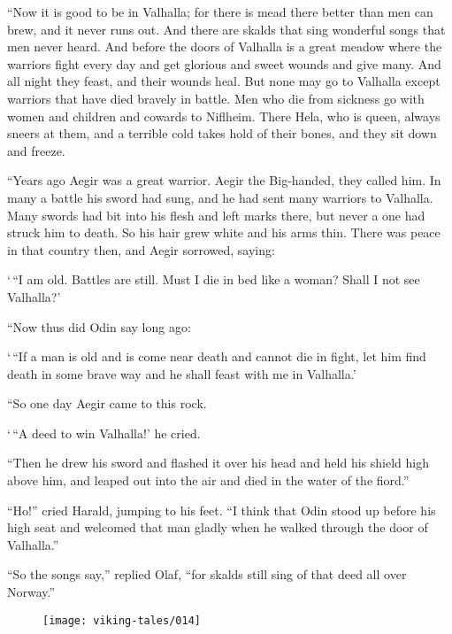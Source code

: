 ``Now it is good to be in Valhalla; for there is mead there better than
men can brew, and it never runs out. And there are skalds that sing
wonderful songs that men never heard. And before the doors of Valhalla
is a great meadow where the warriors fight every day and get glorious
and sweet wounds and give many. And all night they feast, and their
wounds heal. But none may go to Valhalla except warriors that have died
bravely in battle. Men who die from sickness go with women and children
and cowards to Niflheim. There Hela, who is queen, always sneers at
them, and a terrible cold takes hold of their bones, and they sit down
and freeze.

``Years ago Aegir was a great warrior. Aegir the Big-handed, they called
him. In many a battle his sword had sung, and he had sent many warriors
to Valhalla. Many swords had bit into his flesh and left marks there,
but never a one had struck him to death. So his hair grew white and his
arms thin. There was peace in that country then, and Aegir sorrowed,
saying:

`\,``I am old. Battles are still. Must I die in bed like a woman? Shall I
not see Valhalla?'

``Now thus did Odin say long ago:

`\,``If a man is old and is come near death and cannot die in fight, let
him find death in some brave way and he shall feast with me in
Valhalla.'

``So one day Aegir came to this rock.

`\,``A deed to win Valhalla!' he cried.

``Then he drew his sword and flashed it over his head and held his
shield high above him, and leaped out into the air and died in the water
of the fiord.''

``Ho!'' cried Harald, jumping to his feet. ``I think that Odin stood up
before his high seat and welcomed that man gladly when he walked through
the door of Valhalla.''

``So the songs say,'' replied Olaf, ``for skalds still sing of that deed
all over Norway.''

\begin{figure}[hb]
    \centering
    \vskip8pt
    \texttt{[image: viking-tales/014]}
\end{figure}
